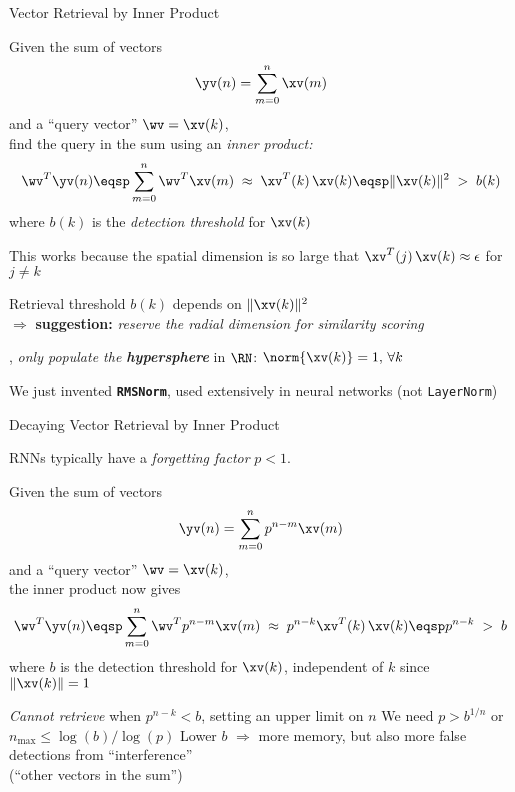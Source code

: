\begin{slide}[\slideopts,toc={Inner Product}]{Vector Retrieval by Inner Product}

  Given the sum of vectors
  \[
  \yv(n) = \sum_{m=0}^n \xv(m)
  \]
  and a ``query vector'' $\wv = \xv(k)$,\\
  \maybepause
  find the query in the sum using an \emph{inner product:}
  \[
  \wv^T\yv(n) \eqsp \sum_{m=0}^n \wv^T\xv(m) \;\approx\; \xv^T(k)\,\xv(k) \eqsp \|\xv(k)\|^2 \;>\; b(k)
  \]
  where $b(k)$ is the \emph{detection threshold} for $\xv(k)$

  \begin{itemize}
  \mpitem This works because the spatial dimension is so large that $\xv^T(j)\,\xv(k)\approx \epsilon$ for $j\ne k$

  \mpitem Retrieval threshold $b(k)$ depends on $\|\xv(k)\|^2$\\
  $\Rightarrow$ \textbf{suggestion:} \emph{reserve the radial dimension for similarity scoring}

  \mpitem \Ie, \emph{only populate the \textbf{hypersphere}} in $\RN$: $\norm{\xv(k)} = 1, \, \forall k$

  \mpitem We just invented \textbf{\texttt{RMSNorm}}, used extensively in neural networks (not \texttt{LayerNorm})

  \end{itemize}

\end{slide}

\begin{slide}[\slideopts,toc={}]{Decaying Vector Retrieval by Inner Product}

  RNNs typically have a \emph{forgetting factor} $p<1$.

  Given the sum of vectors
  \[
  \yv(n) = \sum_{m=0}^n p^{n-m}\xv(m)
  \]
  and a ``query vector'' $\wv = \xv(k)$,\\
  \maybepause
  the inner product now gives
  \[
  \wv^T\yv(n) \eqsp \sum_{m=0}^n \wv^Tp^{n-m}\xv(m) \;\approx\; p^{n-k}\xv^T(k)\,\xv(k) \eqsp p^{n-k} \;>\; b
  \]
  where $b$ is the detection threshold for $\xv(k)$, independent of $k$ since $\|\xv(k)\|=1$

  \begin{itemize}
  \mpitem \emph{Cannot retrieve} when $p^{n-k} < b$, setting an upper limit on $n$
  \mpitem We need $p > b^{1/n}$ or $n_{\mbox{max}} \le \log(b)/\log(p)$
  \mpitem Lower $b$ $\Rightarrow$ more memory, but also more false detections from ``interference''\\
	  (``other vectors in the sum'')
  \end{itemize}

\end{slide}


